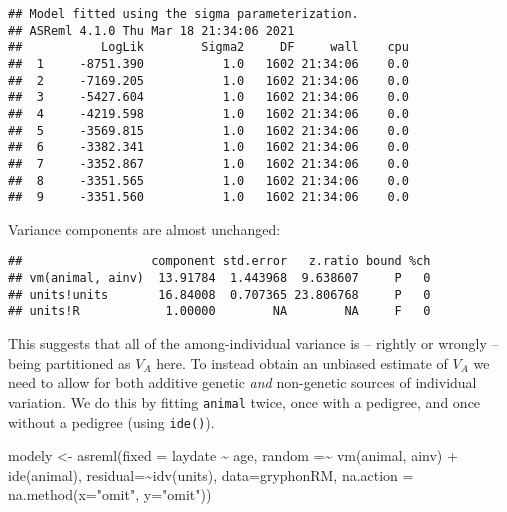 \documentclass[
  12pt,
]{book}
\newenvironment{Shaded}{\begin{snugshade}}{\end{snugshade}}
\newcommand{\AttributeTok}[1]{\textcolor[rgb]{0.77,0.63,0.00}{#1}}
\newcommand{\FunctionTok}[1]{\textcolor[rgb]{0.00,0.00,0.00}{#1}}
\newcommand{\NormalTok}[1]{#1}
\newcommand{\OtherTok}[1]{\textcolor[rgb]{0.56,0.35,0.01}{#1}}
\newcommand{\SpecialCharTok}[1]{\textcolor[rgb]{0.00,0.00,0.00}{#1}}
\newcommand{\StringTok}[1]{\textcolor[rgb]{0.31,0.60,0.02}{#1}}
\begin{document}
\begin{verbatim}
## Model fitted using the sigma parameterization.
## ASReml 4.1.0 Thu Mar 18 21:34:06 2021
##           LogLik        Sigma2     DF     wall    cpu
##  1     -8751.390           1.0   1602 21:34:06    0.0
##  2     -7169.205           1.0   1602 21:34:06    0.0
##  3     -5427.604           1.0   1602 21:34:06    0.0
##  4     -4219.598           1.0   1602 21:34:06    0.0
##  5     -3569.815           1.0   1602 21:34:06    0.0
##  6     -3382.341           1.0   1602 21:34:06    0.0
##  7     -3352.867           1.0   1602 21:34:06    0.0
##  8     -3351.565           1.0   1602 21:34:06    0.0
##  9     -3351.560           1.0   1602 21:34:06    0.0
\end{verbatim}

Variance components are almost unchanged:

\begin{Shaded}
\end{Shaded}

\begin{verbatim}
##                  component std.error   z.ratio bound %ch
## vm(animal, ainv)  13.91784  1.443968  9.638607     P   0
## units!units       16.84008  0.707365 23.806768     P   0
## units!R            1.00000        NA        NA     F   0
\end{verbatim}

This suggests that all of the among-individual variance is -- rightly or wrongly -- being partitioned as \(V_A\) here. To instead obtain an unbiased estimate of \(V_A\) we need to allow for both additive genetic \emph{and} non-genetic sources of individual variation. We do this by fitting \texttt{animal} twice, once with a pedigree, and once without a pedigree (using \texttt{ide()}).

\begin{Shaded}
\begin{Highlighting}[]
\NormalTok{modely }\OtherTok{\textless{}{-}} \FunctionTok{asreml}\NormalTok{(}\AttributeTok{fixed =}\NormalTok{ laydate }\SpecialCharTok{\textasciitilde{}}\NormalTok{ age,}
                 \AttributeTok{random =}\SpecialCharTok{\textasciitilde{}} \FunctionTok{vm}\NormalTok{(animal, ainv) }\SpecialCharTok{+} \FunctionTok{ide}\NormalTok{(animal),}
                 \AttributeTok{residual=}\SpecialCharTok{\textasciitilde{}}\FunctionTok{idv}\NormalTok{(units),}
                 \AttributeTok{data=}\NormalTok{gryphonRM,}
                 \AttributeTok{na.action =} \FunctionTok{na.method}\NormalTok{(}\AttributeTok{x=}\StringTok{"omit"}\NormalTok{, }\AttributeTok{y=}\StringTok{"omit"}\NormalTok{))}
\end{Highlighting}
\end{Shaded}
\end{document}
